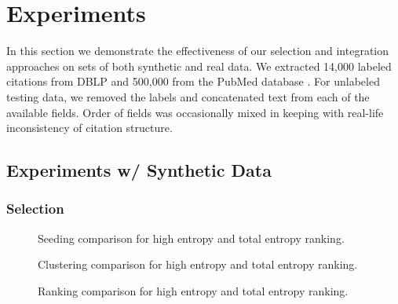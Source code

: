 \section{Experiments}
In this section we demonstrate the effectiveness of our selection and integration approaches on sets of both synthetic and real data.  We extracted 14,000 labeled citations from DBLP  and 500,000 from the PubMed database .  For unlabeled testing data, we removed the labels and concatenated text from each of the available fields.  Order of fields was occasionally mixed in keeping with real-life inconsistency of citation structure.

\subsection{Experiments w/ Synthetic Data}
\subsubsection{Selection}

\begin{figure*}[t]
	\centering
	\caption{Seeding comparison for high entropy and total entropy ranking.}
	\label{fig:select1}
\end{figure*}

\begin{figure*}
	\centering
	\caption{Clustering comparison for high entropy and total entropy ranking.}
	\label{fig:select2}
\end{figure*}

\begin{figure*}
	\centering
	\caption{Ranking comparison for high entropy and total entropy ranking.}
	\label{fig:select3}
\end{figure*}


